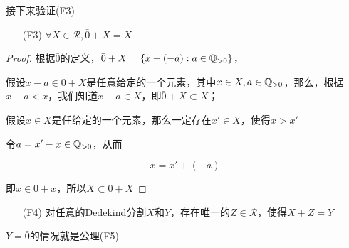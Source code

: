接下来验证(F3)

\begin{itemize}
    \item[(F3)] $\forall X\in \mathcal{R},\bar{0}+X=X$
\end{itemize}

\begin{proof}
    根据$\bar{0}$的定义，$\bar{0}+X=\{x+(-a):a\in \mathbb{Q}_{>0}\}$，
    
    假设$x-a\in \bar{0}+X$是任意给定的一个元素，其中$x\in X,a\in \mathbb{Q}_{>0}$，那么，根据$x-a<x$，我们知道$x-a\in X$，即$\bar{0}+X\subset X$；

    假设$x\in X$是任给定的一个元素，那么一定存在$x'\in X$，使得$x>x'$

    令$a=x'-x\in\mathbb{Q}_{>0}$，从而

    \begin{equation*}
        x=x'+(-a)
    \end{equation*}

    即$x\in \bar{0}+x$，所以$X\subset \bar{0}+X$
\end{proof}

\begin{itemize}
    \item[(F4)] 对任意的Dedekind分割$X$和$Y$，存在唯一的$Z\in \mathcal{R}$，使得$X+Z=Y$ 
\end{itemize}

$Y=\bar{0}$的情况就是公理(F5)

